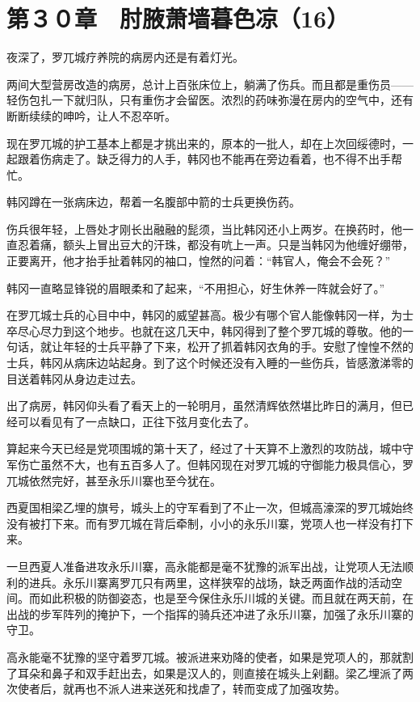 \section{第３０章　肘腋萧墙暮色凉（16） }

夜深了，罗兀城疗养院的病房内还是有着灯光。

两间大型营房改造的病房，总计上百张床位上，躺满了伤兵。而且都是重伤员——轻伤包扎一下就归队，只有重伤才会留医。浓烈的药味弥漫在房内的空气中，还有断断续续的呻吟，让人不忍卒听。

现在罗兀城的护工基本上都是才挑出来的，原本的一批人，却在上次回绥德时，一起跟着伤病走了。缺乏得力的人手，韩冈也不能再在旁边看着，也不得不出手帮忙。

韩冈蹲在一张病床边，帮着一名腹部中箭的士兵更换伤药。

伤兵很年轻，上唇处才刚长出融融的髭须，当比韩冈还小上两岁。在换药时，他一直忍着痛，额头上冒出豆大的汗珠，都没有吭上一声。只是当韩冈为他缠好绷带，正要离开，他才抬手扯着韩冈的袖口，惶然的问着：“韩官人，俺会不会死？”

韩冈一直略显锋锐的眉眼柔和了起来，“不用担心，好生休养一阵就会好了。”

在罗兀城士兵的心目中中，韩冈的威望甚高。极少有哪个官人能像韩冈一样，为士卒尽心尽力到这个地步。也就在这几天中，韩冈得到了整个罗兀城的尊敬。他的一句话，就让年轻的士兵平静了下来，松开了抓着韩冈衣角的手。安慰了惶惶不然的士兵，韩冈从病床边站起身。到了这个时候还没有入睡的一些伤兵，皆感激涕零的目送着韩冈从身边走过去。

出了病房，韩冈仰头看了看天上的一轮明月，虽然清辉依然堪比昨日的满月，但已经可以看见有了一点缺口，正往下弦月变化去了。

算起来今天已经是党项围城的第十天了，经过了十天算不上激烈的攻防战，城中守军伤亡虽然不大，也有五百多人了。但韩冈现在对罗兀城的守御能力极具信心，罗兀城依然完好，甚至永乐川寨也至今犹在。

西夏国相梁乙埋的旗号，城头上的守军看到了不止一次，但城高濠深的罗兀城始终没有被打下来。而有罗兀城在背后牵制，小小的永乐川寨，党项人也一样没有打下来。

一旦西夏人准备进攻永乐川寨，高永能都是毫不犹豫的派军出战，让党项人无法顺利的进兵。永乐川寨离罗兀只有两里，这样狭窄的战场，缺乏两面作战的活动空间。而如此积极的防御姿态，也是至今保住永乐川城的关键。而且就在两天前，在出战的步军阵列的掩护下，一个指挥的骑兵还冲进了永乐川寨，加强了永乐川寨的守卫。

高永能毫不犹豫的坚守着罗兀城。被派进来劝降的使者，如果是党项人的，那就割了耳朵和鼻子和双手赶出去，如果是汉人的，则直接在城头上剁翻。梁乙埋派了两次使者后，就再也不派人进来送死和找虐了，转而变成了加强攻势。


